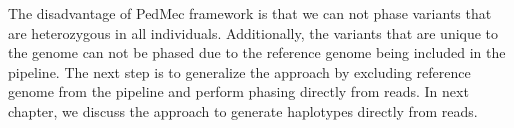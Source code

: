 The disadvantage of PedMec framework is that we can not phase variants that are heterozygous in all individuals.
Additionally, the variants that are unique to the genome can not be phased due to the reference genome being included in the pipeline.
The next step is to generalize the approach by excluding reference genome from the pipeline and perform phasing directly from reads.
In next chapter, we discuss the approach to generate haplotypes directly from reads.

% 






